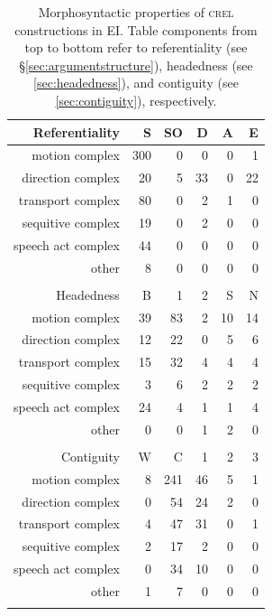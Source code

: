 \begin{table}
\centering
\begin{tabular}{rrrrrr}
  \lsptoprule
Referentiality & S & SO & D & A & E \\ 
  \midrule
motion complex & 300 &   0 &   0 &   0 &   1 \\ 
  direction complex &  20 &   5 &  33 &   0 &  22 \\ 
  transport complex &  80 &   0 &   2 &   1 &   0 \\ 
  sequitive complex &  19 &   0 &   2 &   0 &   0 \\ 
  speech act complex &  44 &   0 &   0 &   0 &   0 \\ 
  other &   8 &   0 &   0 &   0 &   0 \\ 
   \midrule
 \\
  \midrule
Headedness & B & 1 & 2 & S & N \\ 
  \midrule
motion complex &  39 &  83 &   2 &  10 &  14 \\ 
  direction complex &  12 &  22 &   0 &   5 &   6 \\ 
  transport complex &  15 &  32 &   4 &   4 &   4 \\ 
  sequitive complex &   3 &   6 &   2 &   2 &   2 \\ 
  speech act complex &  24 &   4 &   1 &   1 &   4 \\ 
  other &   0 &   0 &   1 &   2 &   0 \\ 
   \midrule
 \\
  \midrule
Contiguity & W & C & 1 & 2 & 3 \\ 
  \midrule
motion complex &   8 & 241 &  46 &   5 &   1 \\ 
  direction complex &   0 &  54 &  24 &   2 &   0 \\ 
  transport complex &   4 &  47 &  31 &   0 &   1 \\ 
  sequitive complex &   2 &  17 &   2 &   0 &   0 \\ 
  speech act complex &   0 &  34 &  10 &   0 &   0 \\ 
  other &   1 &   7 &   0 &   0 &   0 \\ 
   \lspbottomrule
\end{tabular}
\caption[Morphosyntactic properties of \textsc{crel} constructions]{Morphosyntactic properties of \textsc{crel} constructions in EI. Table components from top to bottom refer to referentiality (see §\ref{sec:argumentstructure}), headedness (see \ref{sec:headedness}), and contiguity (see \ref{sec:contiguity}), respectively.}
\label{table:crel_formal}
\end{table}

